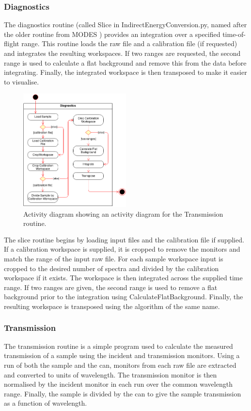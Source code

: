 \documentclass[paper=a4, fontsize=11pt]{scrartcl}	%
\numberwithin{equation}{section}															%
\numberwithin{figure}{section}																%
\numberwithin{table}{section}																%
\begin{document}
\subsubsection{Diagnostics}
The diagnostics routine (called Slice in IndirectEnergyConversion.py, named after the older routine from MODES \cite{wshowells2010}) provides an integration over a specified time-of-flight range. This routine loads the raw file and a calibration file (if requested) and integrates the resulting workspaces. If two ranges are requested, the second range is used to calculate a flat background and remove this from the data before integrating. Finally, the integrated workspace is then transposed to make it easier to visualise.

\begin{figure}[H]
\centering
\includegraphics[width=0.5\textwidth]{img/uml/activity_diagrams/Diagnostics_activity.png}
\caption{Activity diagram showing an activity diagram for the Transmission routine.}
\label{fig:c2e-diagnostics-activity-diagram}
\end{figure}

The slice routine begins by loading input files and the calibration file if supplied. If a calibration workspace is supplied, it is cropped to remove the monitors and match the range of the input raw file. For each sample workspace input is cropped to the desired number of spectra and divided by the calibration workspace if it exists. The workspace is then integrated across the supplied time range. If two ranges are given, the second range is used to remove a flat background prior to the integration using CalculateFlatBackground. Finally, the resulting workspace is transposed using the algorithm of the same name.

\subsubsection{Transmission}
The transmission routine is a simple program used to calculate the measured transmission of a sample using the incident and transmission monitors. Using a run of both the sample and the can, monitors from each  raw file are extracted and converted to units of wavelength. The transmission monitor is then normalised by the incident monitor in each run over the common wavelength range. Finally, the sample is divided by the can to give the sample transmission as a function of wavelength.
\end{document}
